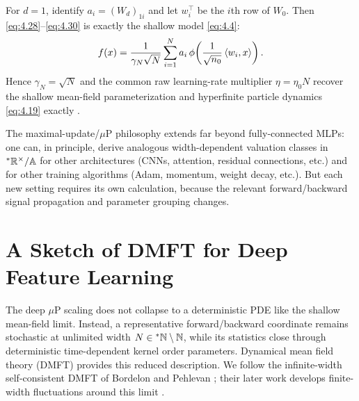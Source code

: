 \begin{remark}[Shallow Mean Field as the $d = 1$ Case]\label{rem:4.7}
For $d = 1$, identify $a_i = (W_d)_{1i}$ and let $w_i^\top$ be the $i$th row of $W_0$. Then \eqref{eq:4.28}--\eqref{eq:4.30} is exactly the shallow model \eqref{eq:4.4}:
\begin{equation}\label{eq:4.54}
f(x) = \frac{1}{\gamma_N\sqrt{N}}\sum_{i=1}^N a_i\,\phi\!\left(\frac{1}{\sqrt{n_0}}\left\langle w_i, x \right\rangle\right).
\end{equation}
Hence $\gamma_N = \sqrt{N}$ and the common raw learning-rate multiplier $\eta = \eta_0 N$ recover the shallow mean-field parameterization and hyperfinite particle dynamics \eqref{eq:4.19} exactly \cite{yang2021tensor}.
\end{remark}

\begin{remark}[Generality]\label{rem:4.8}
The maximal-update/$\mu$P philosophy extends far beyond fully-connected MLPs: one can, in principle, derive analogous width-dependent valuation classes in ${}^*\mathbb{R}^\times / \mathbb{A}$ for other architectures (CNNs, attention, residual connections, etc.) and for other training algorithms (Adam, momentum, weight decay, etc.). But each new setting requires its own calculation, because the relevant forward/backward signal propagation and parameter grouping changes.
\end{remark}

\section{A Sketch of DMFT for Deep Feature Learning}
\label{sec:4.5}

The deep $\mu$P scaling does not collapse to a deterministic PDE like the shallow mean-field limit. Instead, a representative forward/backward coordinate remains stochastic at unlimited width $N \in {}^*\mathbb{N} \setminus \mathbb{N}$, while its statistics close through deterministic time-dependent kernel order parameters. Dynamical mean field theory (DMFT) provides this reduced description. We follow the infinite-width self-consistent DMFT of Bordelon and Pehlevan \cite[Secs.~2--3 and App.~D.7]{bordelon2022self}; their later work develops finite-width fluctuations around this limit \cite{bordelon2023dynamics}.

